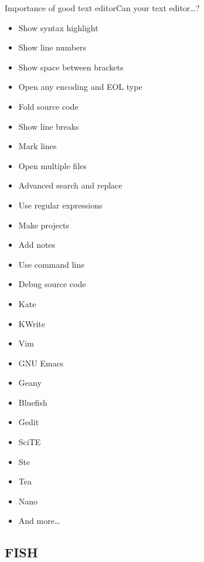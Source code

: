 \documentclass[compress, ucs, xelatex, 11pt, xcolor=svgnames,
  hyperref={
    bookmarks=true,
    unicode=true,
    colorlinks=true,
    pdftitle={Linux, command line and MetaCentrum},
    plainpages=false,
    pdfauthor={Vojtech Zeisek},
    pdfsubject={Course about use of Linux command line, writing shell scripts and using MetaCentrum of CESNET},
    pdfcreator={XeLaTeX, http://www.xelatex.org/},
    pdfkeywords={Linux, GNU, BASH, shell, command line, MetaCentrum},
    linkcolor=Sienna,
    anchorcolor=black,
    citecolor=green,
    filecolor=magenta,
    menucolor=Sienna,
    urlcolor=cyan,
    pdftex},
  url={hyphens, lowtilde} %
  ]{beamer}
\begin{document}
\begin{frame}[label=editors]{Importance of good text editor}{Can your text editor\ldots ?}
\begin{multicols}{2}
  \begin{itemize}
    \item Show syntax highlight
    \item Show line numbers
    \item Show space between brackets
    \item Open any encoding and EOL type
    \item Fold source code
    \item Show line breaks
    \item Mark lines
    \item Open multiple files
    \item Advanced search and replace
    \item Use regular expressions
    \item Make projects
    \item Add notes
    \item Use command line
    \item Debug source code
  \end{itemize}
\end{multicols}
\begin{multicols}{4}
  \begin{itemize}
    \item Kate
    \item KWrite
    \item Vim
    \item GNU Emacs
    \item Geany
    \item Bluefish
    \item Gedit
    \item SciTE
    \item Ste
    \item Tea
    \item Nano
    \item And more\ldots
  \end{itemize}
\end{multicols}
\end{frame}

\subsection{FISH}
\end{document}
